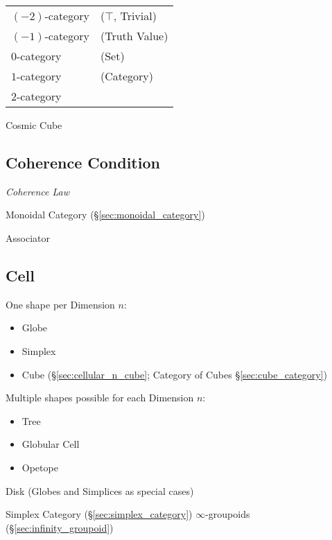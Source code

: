 \begin{tabular}{l l}
  $(-2)$-category   & ($\top$, Trivial) \\
  $(-1)$-category   & (Truth Value) \\
  $0$-category      & (Set) \\
  $1$-category      & (Category) \\
  $2$-category      & \\
\end{tabular}

Cosmic Cube %



\subsection{Coherence Condition}\label{sec:coherence_condition}

\emph{Coherence Law}

Monoidal Category (\S\ref{sec:monoidal_category})

Associator



\subsection{Cell}\label{sec:cell}

One shape per Dimension $n$:
\begin{itemize}
  \item Globe
  \item Simplex
  \item Cube (\S\ref{sec:cellular_n_cube}; \fist Category of Cubes
    \S\ref{sec:cube_category})
\end{itemize}

Multiple shapes possible for each Dimension $n$:
\begin{itemize}
  \item Tree
  \item Globular Cell
  \item Opetope
\end{itemize}

Disk (Globes and Simplices as special cases)

\fist Simplex Category (\S\ref{sec:simplex_category})
$\infty$-groupoids (\S\ref{sec:infinity_groupoid})

